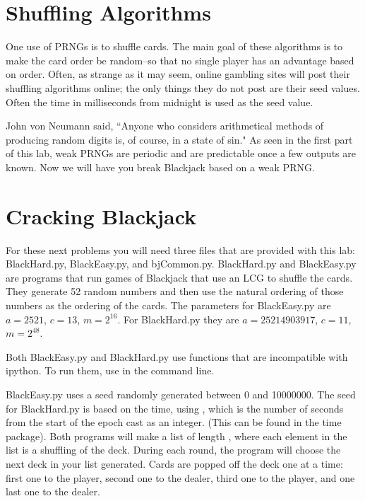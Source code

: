 \section*{Shuffling Algorithms}
One use of PRNGs is to shuffle cards.
The main goal of these algorithms is to make the card order be random--so that no single player has an advantage based on order.
Often, as strange as it may seem, online gambling sites will post their shuffling algorithms online; the only things they do not post are their seed values.
Often the time in milliseconds from midnight is used as the seed value.

John von Neumann said, ``Anyone who considers arithmetical methods of producing random digits is, of course, in a state of sin."
As seen in the first part of this lab, weak PRNGs are periodic and are predictable once a few outputs are known.
Now we will have you break Blackjack based on a weak PRNG.

\section*{Cracking Blackjack}
For these next problems you will need three files that are provided with this lab: BlackHard.py, BlackEasy.py, and bjCommon.py.
BlackHard.py and BlackEasy.py are programs that run games of Blackjack that use an LCG to shuffle the cards.
They generate 52 random numbers and then use the natural ordering of those numbers as the ordering of the cards.
The parameters for BlackEasy.py are $a=2521$, $c=13$, $m=2^{16}$.
For BlackHard.py they are $a=25214903917$, $c=11$, $m=2^{48}$.

\begin{warn}
Both BlackEasy.py and BlackHard.py use functions that are incompatible with ipython.
To run them, use  in the command line.
\end{warn}

BlackEasy.py uses a seed randomly generated between 0 and 10000000.
The seed for BlackHard.py is based on the time, using , which is the number of seconds from the start of the epoch cast as an integer.
(This can be found in the time package).
Both programs will make a list of length , where each element in the list is a shuffling of the deck.
During each round, the program will choose the next deck in your list generated.
Cards are popped off the deck one at a time: first one to the player, second one to the dealer, third one to the player, and one last one to the dealer. 

